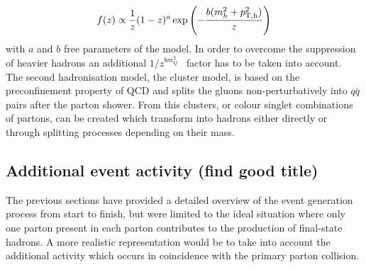 \begin{equation}
 f(z) \propto \frac{1}{z} (1-z)^{a} \exp \left( - \frac{b(m_{h}^{2} + p_{\rm T,h}^{2})}{z} \right)
\end{equation}
with $a$ and $b$ free parameters of the model.
In order to overcome the suppression of heavier hadrons an additional $1/z^{bm_{Q}^{2}}$~\cite{} factor has to be taken into account.
\\
The second hadronisation model, the cluster model, is based on the preconfinement property of QCD and splits the gluons non-perturbatively into $q\bar{q}$ pairs after the parton shower. From this clusters, or colour singlet combinations of partons, can be created which transform into hadrons either directly or through splitting processes depending on their mass. 

\subsection{Additional event activity (find good title)}%

The previous sections have provided a detailed overview of the event generation process from start to finish, but were limited to the ideal situation where only one parton present in each parton contributes to the production of final-state hadrons. A more realistic representation would be to take into account the additional activity which occurs in coincidence with the primary parton collision. 
\\

